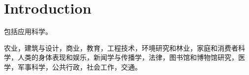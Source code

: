 


\chapter{Introduction}

包括应用科学。

农业，建筑与设计，商业，教育，工程技术，环境研究和林业，家庭和消费者科学，人类的身体表现和娱乐，新闻学与传播学，法律，图书馆和博物馆研究，医学，军事科学，公共行政，社会工作，交通。





